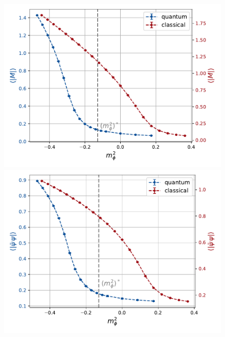 \begin{figure}
    \centering
    \begin{minipage}{0.45\textwidth}
        \includegraphics[scale=0.5]{figures/chiral_PT/mass_scan/magnetisation.pdf}
    \end{minipage}
    \hfill
    \begin{minipage}{0.45\textwidth}
        \includegraphics[scale=0.5]{figures/chiral_PT/mass_scan/condensate.pdf}
    \end{minipage}
    \begin{minipage}{0.45\textwidth}

\end{minipage}
\end{figure}
